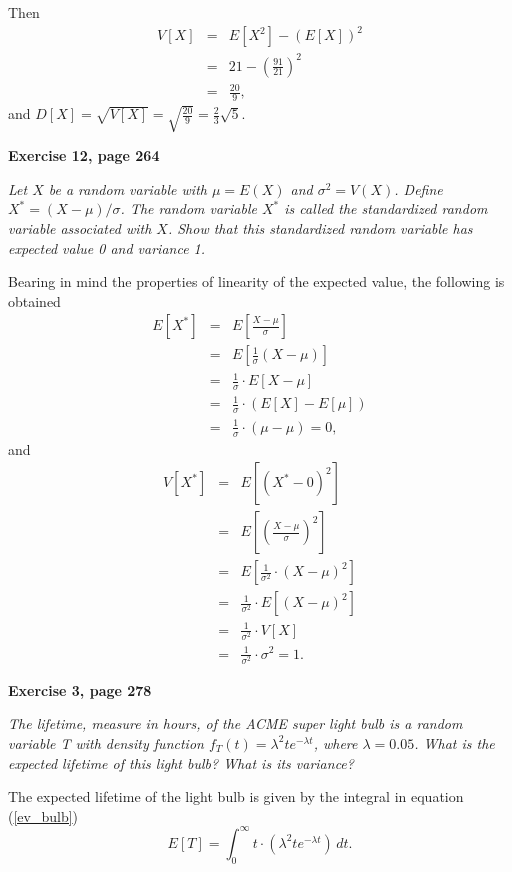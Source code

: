 \documentclass[12pt]{article}
\begin{document}
	Then 
	\begin{eqnarray*}
	V[X] &=& E[X^2] - \left(E[X]\right)^2 \\
	&=& 21 - \left( \frac{91}{21} \right)^2 \\
	&=& \frac{20}{9}, 
	\end{eqnarray*}
	and $D[X] = \sqrt{V[X]} = \sqrt{\frac{20}{9}} = \frac{2}{3} \sqrt{5}$.
	
	{\bf Exercise 12, page 264}
	
	{\em Let $X$ be a random variable with $\mu = E(X)$ and $\sigma^2 = V(X)$. Define $X^* = (X-\mu)/\sigma$. The random variable $X^*$ is called the \textit{standardized random variable} associated with $X$. Show that this standardized random variable has expected value 0 and variance 1.}
	
	Bearing in mind the properties of linearity of the expected value, the following is obtained 
	\begin{eqnarray*}
	E[X^*] &=& E \left[ \frac{X - \mu }{\sigma}\right]\\
	 &=& E \left[ \frac{1}{\sigma}\left( X - \mu \right)\right] \\
	 &=& \frac{1}{\sigma} \cdot E[X - \mu] \\
	&=& \frac{1}{\sigma} \cdot \left( E[X] - E[\mu] \right) \\
	&=& \frac{1}{\sigma} \cdot \left( \mu - \mu \right) = 0,
	\end{eqnarray*}
	and 
	\begin{eqnarray*}
	V[X^*] &=& E[(X^* - 0)^2] \\
	&=& E\left[\left(\frac{X - \mu}{\sigma} \right)^2 \right] \\
	&=& E\left[\frac{1}{\sigma^2} \cdot (X - \mu)^2 \right] \\
	&=& \frac{1}{\sigma^2} \cdot E[(X - \mu)^2] \\
	&=& \frac{1}{\sigma^2} \cdot V[X] \\
	&=& \frac{1}{\sigma^2} \cdot \sigma^2 = 1.
	\end{eqnarray*}
	
	{\bf Exercise 3, page 278}
	
	{\em The lifetime, measure in hours, of the ACME super light bulb is a random variable T with density function \(f_T (t) = \lambda^2 te^{- \lambda t}\), where \(\lambda = 0.05\). What is the expected lifetime of this light bulb? What is its variance?}
	
	The expected lifetime of the light bulb is given by the integral in equation (\ref{ev_bulb})
	\begin{equation}
	E[T] = \int_{0}^{\infty} t \cdot \left( \lambda^2 t e^{-\lambda t} \right) \, dt.
	\label{ev_bulb}
	\end{equation}
	
\end{document}
